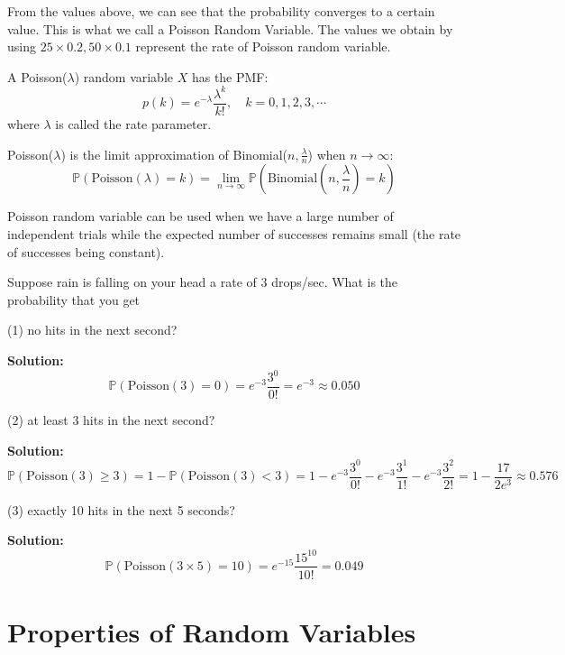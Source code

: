 From the values above, we can see that the probability converges to a certain value. This is what we call a Poisson Random Variable. The values we obtain by using \(25 \times 0.2, 50 \times 0.1\) represent the rate of Poisson random variable.
\newpage

\begin{definition}
  A Poisson(\(\lambda\)) random variable \(X\) has the PMF:
  \[
    p(k) = e^{-\lambda}\dfrac{\lambda^k}{k!}, \quad k = 0, 1, 2, 3, \cdots
  \]
  where \(\lambda\) is called the rate parameter.
\end{definition}

\begin{theorem}
  Poisson(\(\lambda\)) is the limit approximation of Binomial(\(n, \frac{\lambda}{n}\)) when \(n \to \infty\): 
  \[
    \mathbb{P}(\text{Poisson}(\lambda) = k) = \lim_{n \to \infty} \mathbb{P}(\text{Binomial}(n, \dfrac{\lambda}{n}) = k)
  \]
\end{theorem}

Poisson random variable can be used when we have a large number of independent trials while the expected number of successes remains small (the rate of successes being constant). 

\begin{eg}
  Suppose rain is falling on your head a rate of 3 drops/sec. What is the probability that you get 
  
  (1) no hits in the next second? 
  
  \textbf{Solution:} 
  \[
    \mathbb{P}(\text{Poisson}(3) = 0) = e^{-3}\dfrac{3^0}{0!} = e^{-3} \approx 0.050
  \]

  (2) at least 3 hits in the next second? 

  \textbf{Solution:} 
  \[
    \mathbb{P}(\text{Poisson}(3) \geq 3) = 1 - \mathbb{P}(\text{Poisson}(3) < 3) = 1 - e^{-3}\dfrac{3^0}{0!} - e^{-3}\dfrac{3^1}{1!} - e^{-3}\dfrac{3^2}{2!} = 1 - \dfrac{17}{2 e^{3}} \approx 0.576
  \]

  (3) exactly 10 hits in the next 5 seconds?

  \textbf{Solution:} 
  \[
    \mathbb{P}(\text{Poisson}(3 \times 5) = 10) = e^{-15}\dfrac{15^{10} }{10!} = 0.049
  \]
\end{eg}

\section{Properties of Random Variables}

